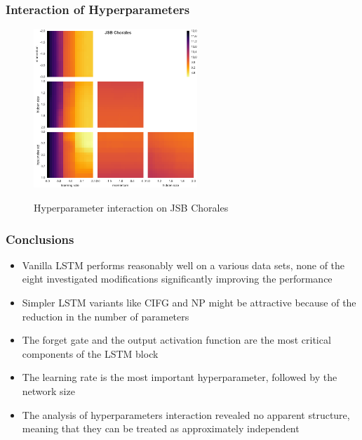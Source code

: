 \documentclass{beamer}
\begin{document}
\begin{frame}
\frametitle{Interaction of Hyperparameters}
\begin{figure}
        {\includegraphics[width=0.55\textwidth]{jsb_variance.png}}
        \caption{Hyperparameter interaction on JSB Chorales}
    \end{figure}
\end{frame}

\begin{frame}
\frametitle{Conclusions}
\begin{itemize}
	\item Vanilla LSTM performs reasonably well on a various data sets, none of the eight investigated modifications significantly improving the performance
	\item Simpler LSTM variants like CIFG and NP might be attractive because of the reduction in the number of parameters
	\item The forget gate and the output activation function are the most critical components of the LSTM block
	\item The learning rate is the most important hyperparameter, followed by the network size
	\item The analysis of hyperparameters interaction revealed no apparent structure, meaning that they can be treated as approximately independent
\end{itemize}
\end{frame}
\end{document}
